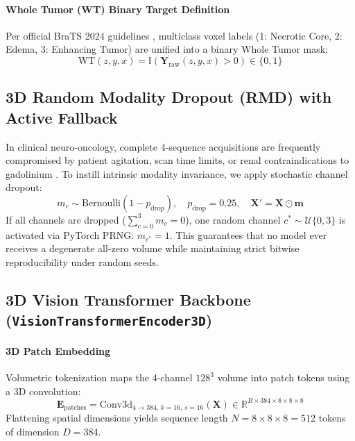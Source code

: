 \documentclass{article}
\begin{document}
\paragraph{Whole Tumor (WT) Binary Target Definition}
Per official BraTS 2024 guidelines \citep{brats2024}, multiclass voxel labels (1: Necrotic Core, 2: Edema, 3: Enhancing Tumor) are unified into a binary Whole Tumor mask:
\begin{equation}
    \text{WT}(z, y, x) = \mathbb{I}(\mathbf{Y}_{\text{raw}}(z, y, x) > 0) \in \{0, 1\}
\end{equation}

\subsection{3D Random Modality Dropout (RMD) with Active Fallback}

In clinical neuro-oncology, complete 4-sequence acquisitions are frequently compromised by patient agitation, scan time limits, or renal contraindications to gadolinium \citep{havaei2017brain,dorent2019hetero}. To instill intrinsic modality invariance, we apply stochastic channel dropout:
\begin{equation}
    m_c \sim \text{Bernoulli}(1 - p_{\text{drop}}), \quad p_{\text{drop}} = 0.25, \quad \mathbf{X}' = \mathbf{X} \odot \mathbf{m}
\end{equation}
If all channels are dropped ($\sum_{c=0}^3 m_c = 0$), one random channel $c^* \sim \mathcal{U}\{0, 3\}$ is activated via PyTorch PRNG: $m_{c^*} = 1$. This guarantees that no model ever receives a degenerate all-zero volume while maintaining strict bitwise reproducibility under random seeds.

\subsection{3D Vision Transformer Backbone (\texttt{VisionTransformerEncoder3D})}

\paragraph{3D Patch Embedding}
Volumetric tokenization maps the 4-channel $128^3$ volume into patch tokens using a 3D convolution:
\begin{equation}
    \mathbf{E}_{\text{patches}} = \text{Conv3d}_{4 \to 384, \, k=16, \, s=16}(\mathbf{X}) \in \mathbb{R}^{B \times 384 \times 8 \times 8 \times 8}
\end{equation}
Flattening spatial dimensions yields sequence length $N = 8 \times 8 \times 8 = 512$ tokens of dimension $D = 384$.
\end{document}
